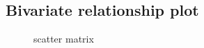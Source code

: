 \documentclass[article]{jss}
\begin{document}

\subsection{Bivariate relationship plot}

\begin{figure}[htbp]
\centering
{}
\caption{\label{fig:scaMatrix} scatter matrix}
\end{figure}
\end{document}

